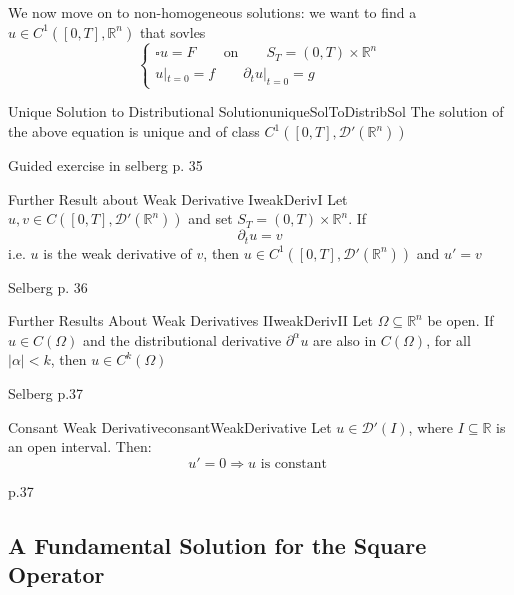 \documentclass{book}
\newenvironment{Proof}[1][]
  {\begin{ProofTcb}[#1]}
  {\end{ProofTcb}}
\newcommand{\R}{{\mathbb{R}}}
\newcommand{\CD}{{\mathcal{D}}}
\newcommand{\sse}{\subseteq}
\newcommand{\Rw}{\Rightarrow}
\begin{document}
We now move on to non-homogeneous solutions: we want to find a $u \in C^1([0, T], \R^n)$ that sovles
\[
	\begin{cases}
	\square u = F \qquad \text{on} \qquad S_T = (0, T)\times \R^n\\
	u|_{t = 0} = f \qquad  \partial_tu|_{t=0} = g
	\end{cases}
\]
\begin{thm}{Unique Solution to Distributional Solution}{uniqueSolToDistribSol}
	The solution of the above equation is unique and of class $C^1([0, T], \CD'(\R^n))$
\end{thm}

\begin{Proof}
	Guided exercise in selberg p. 35
\end{Proof}

\begin{prop}{Further Result about Weak Derivative I}{weakDerivI}
	Let $u,v \in C([0, T], \CD'(\R^n))$ and set $S_T = (0,T)\times \R^n$. If
	\[
		 \partial_t u = v
	 \]
	 i.e. $u$ is the weak derivative of $v$, then $u \in C^1([0,T], \CD'(\R^n))$ and $u' = v$
\end{prop}

\begin{Proof}
	Selberg p. 36
\end{Proof}

\begin{prop}{Further Results About Weak Derivatives II}{weakDerivII}
	Let $\Omega \sse \R^n$ be open. If $u \in C(\Omega)$ and the distributional derivative $  \partial^\alpha u$ are
	also in $C(\Omega)$, for all $|\alpha| < k$, then $u \in C^k(\Omega)$
\end{prop}

\begin{Proof}
	Selberg p.37
\end{Proof}

\begin{prop}{Consant Weak Derivative}{consantWeakDerivative}
	Let $u \in \CD'(I)$, where $I \sse \R$ is an open interval. Then:
	\[
		u' = 0 \Rw u\text{ is constant }
	\]
\end{prop}

\begin{Proof}
	p.37
\end{Proof}

\subsection{A Fundamental Solution for the Square Operator}
\end{document}

